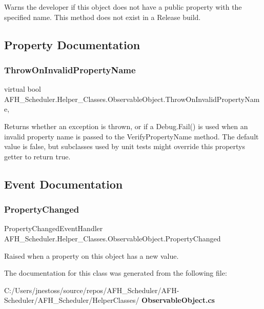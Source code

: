 Warns the developer if this object does not have a public property with the specified name. This method does not exist in a Release build. 



\subsection{Property Documentation}
\mbox{\label{class_a_f_h___scheduler_1_1_helper___classes_1_1_observable_object_a07b41b9e4ddf03f2dc031cdce854eee5}} 
\subsubsection{ThrowOnInvalidPropertyName}
{\footnotesize\ttfamily virtual bool A\+F\+H\+\_\+\+Scheduler.\+Helper\+\_\+\+Classes.\+Observable\+Object.\+Throw\+On\+Invalid\+Property\+Name\hspace{0.3cm}{\ttfamily [get]}, {\ttfamily [protected]}}



Returns whether an exception is thrown, or if a Debug.\+Fail() is used when an invalid property name is passed to the Verify\+Property\+Name method. The default value is false, but subclasses used by unit tests might override this property\textquotesingle{}s getter to return true. 



\subsection{Event Documentation}
\mbox{\label{class_a_f_h___scheduler_1_1_helper___classes_1_1_observable_object_ad081083858a319387cad74c739ebc339}} 
\subsubsection{PropertyChanged}
{\footnotesize\ttfamily Property\+Changed\+Event\+Handler A\+F\+H\+\_\+\+Scheduler.\+Helper\+\_\+\+Classes.\+Observable\+Object.\+Property\+Changed}



Raised when a property on this object has a new value. 



The documentation for this class was generated from the following file\+:\begin{DoxyCompactItemize}
\item 
C\+:/\+Users/jnestoss/source/repos/\+A\+F\+H\+\_\+\+Scheduler/\+A\+F\+H-\/\+Scheduler/\+A\+F\+H\+\_\+\+Scheduler/\+Helper\+Classes/\textbf{ Observable\+Object.\+cs}\end{DoxyCompactItemize}
